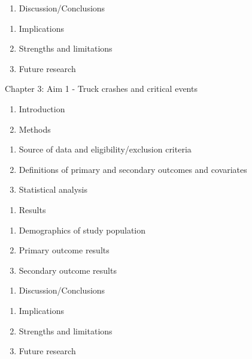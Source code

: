\documentclass[12pt]{book}
\numberwithin{equation}{chapter}
\providecommand{\tightlist}{%
  \setlength{\itemsep}{0pt}\setlength{\parskip}{0pt}}
\begin{document}
\begin{enumerate}
\def\labelenumi{\Alph{enumi}.}
\setcounter{enumi}{3}
\tightlist
\item
  Discussion/Conclusions
\end{enumerate}

\begin{enumerate}
\def\labelenumi{\arabic{enumi}.}
\tightlist
\item
  Implications
\item
  Strengths and limitations
\item
  Future research
\end{enumerate}

Chapter 3: Aim 1 - Truck crashes and critical events

\begin{enumerate}
\def\labelenumi{\Alph{enumi}.}
\tightlist
\item
  Introduction
\item
  Methods
\end{enumerate}

\begin{enumerate}
\def\labelenumi{\arabic{enumi}.}
\tightlist
\item
  Source of data and eligibility/exclusion criteria
\item
  Definitions of primary and secondary outcomes and covariates
\item
  Statistical analysis
\end{enumerate}

\begin{enumerate}
\def\labelenumi{\Alph{enumi}.}
\setcounter{enumi}{2}
\tightlist
\item
  Results
\end{enumerate}

\begin{enumerate}
\def\labelenumi{\arabic{enumi}.}
\tightlist
\item
  Demographics of study population
\item
  Primary outcome results
\item
  Secondary outcome results
\end{enumerate}

\begin{enumerate}
\def\labelenumi{\Alph{enumi}.}
\setcounter{enumi}{3}
\tightlist
\item
  Discussion/Conclusions
\end{enumerate}

\begin{enumerate}
\def\labelenumi{\arabic{enumi}.}
\tightlist
\item
  Implications
\item
  Strengths and limitations
\item
  Future research
\end{enumerate}
\end{document}
